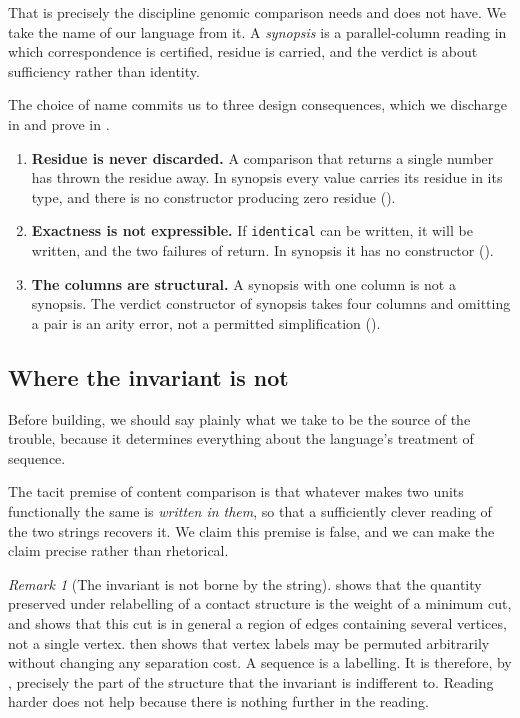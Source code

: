 \documentclass[11pt,twocolumn,a4paper]{article}
\theoremstyle{plain}
\theoremstyle{definition}
\theoremstyle{remark}
\newtheorem{remark}[theorem]{Remark}
\begin{document}
That is precisely the discipline genomic comparison needs and does not
have. We take the name of our language from it. A \emph{synopsis} is a
parallel-column reading in which correspondence is certified, residue is
carried, and the verdict is about sufficiency rather than identity.

The choice of name commits us to three design consequences, which we
discharge in  and prove in .

\begin{enumerate}[label=(\alph*),leftmargin=2.2em]
\item \textbf{Residue is never discarded.} A comparison that returns a
      single number has thrown the residue away. In synopsis every value
      carries its residue in its type, and there is no constructor
      producing zero residue ().
\item \textbf{Exactness is not expressible.} If \texttt{identical} can be
      written, it will be written, and the two failures of
       return. In synopsis it has no constructor
      ().
\item \textbf{The columns are structural.} A synopsis with one column is
      not a synopsis. The verdict constructor of synopsis takes four
      columns and omitting a pair is an arity error, not a permitted
      simplification ().
\end{enumerate}

\subsection{Where the invariant is not}
\label{sec:notinseq}

Before building, we should say plainly what we take to be the source of
the trouble, because it determines everything about the language's
treatment of sequence.

The tacit premise of content comparison is that whatever makes two units
functionally the same is \emph{written in them}, so that a sufficiently
clever reading of the two strings recovers it. We claim this premise is
false, and we can make the claim precise rather than rhetorical.

\begin{remark}[The invariant is not borne by the string]
\label{rem:bearing}
 shows that the quantity preserved under
relabelling of a contact structure is the weight of a minimum cut, and
 shows that this cut is in general a region of edges
containing several vertices, not a single vertex. 
then shows that vertex labels may be permuted arbitrarily without
changing any separation cost. A sequence is a labelling. It is
therefore, by , precisely the part of the structure
that the invariant is indifferent to. Reading harder does not help
because there is nothing further in the reading.
\end{remark}
\end{document}
